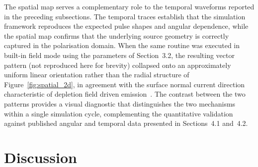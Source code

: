\documentclass[12pt]{final_project_report}
\begin{document}
The spatial map serves a complementary role to the temporal waveforms reported in the preceding subsections. The temporal traces establish that the simulation framework reproduces the expected pulse shapes and angular dependence, while the spatial map confirms that the underlying source geometry is correctly captured in the polarisation domain. When the same routine was executed in built-in field mode using the parameters of Section~3.2, the resulting vector pattern (not reproduced here for brevity) collapsed onto an approximately uniform linear orientation rather than the radial structure of Figure~\ref{fig:spatial_2d}, in agreement with the surface normal current direction characteristic of depletion field driven emission~\cite{YangTonouchi2022,SimulationTHz}. The contrast between the two patterns provides a visual diagnostic that distinguishes the two mechanisms within a single simulation cycle, complementing the quantitative validation against published angular and temporal data presented in Sections~4.1 and~4.2.

\section{Discussion}
\end{document}
